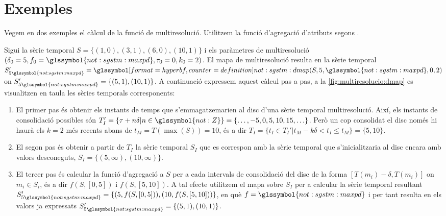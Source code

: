 \section{Exemples}

Vegem en dos exemples el càlcul de la funció de multiresolució.
Utilitzem la funció d'agregació d'atributs 
segons .


\begin{example}
  \label{ex:multiresolucio:dmap}
  Sigui la sèrie temporal $S=\{(1,0),(3,1),(6,0),(10,1)\}$ i els
  paràmetres de multiresolució
  $(\delta_0=5,f_0=\glssymbol{not:sgstm:maxpd},\tau_0=0,k_0=2)$.  El
  mapa de multiresolució resulta en la sèrie temporal
  $S_{5\glssymbol{not:sgstm:maxpd}}'=
  \glssymboldef{not:sgstm:dmap}(S,5,\glssymbol{not:sgstm:maxpd},0,2)$
  on $S'_{5\glssymbol{not:sgstm:maxpd}}=\{(5,1),(10,1)\}$. A
  continuació expressem aquest càlcul pas a pas, a la
  \autoref{fig:multiresolucio:dmap} es visualitzen en taula les sèries
  temporals corresponents:
  \begin{enumerate}
  \item El primer pas és obtenir els instants de temps que
    s'emmagatzemarien al disc d'una sèrie temporal
    multiresolució. Així, els instants de consolidació possibles són
    $T_I'=\{\tau+n\delta|n\in\glssymbol{not:Z}\}=
    \{\ldots,-5,0,5,10,15,\ldots\}$. Però un cop consolidat el disc
    només hi haurà els $k=2$ més recents abans de $t_M=T(\max(S))=10$,
    és a dir $T_I=\{t_I\in T_I'|t_M - k\delta < t_I \leq
    t_M\}=\{5,10\}$.

  \item El segon pas és obtenir a partir de $T_I$ la sèrie temporal
    $S_I$ que es correspon amb la sèrie temporal que s'inicialitzaria
    al disc encara amb valors desconeguts,
    $S_I=\{(5,\infty),(10,\infty)\}$.



  \item El tercer pas és calcular la funció d'agregació a $S$ per a
    cada intervals de consolidació del disc de la forma
    $[T(m_i)-\delta,T(m_i)]$ on $m_i\in S_i$, és a dir $f(S,[0,5])$ i
    $f(S,[5,10])$. A tal efecte utilitzem el mapa sobre $S_I$ per a
    calcular la sèrie temporal resultant
    $S'_{5\glssymbol{not:sgstm:maxpd}}=\{ (5,f(S,[0,5])),
    (10,f(S,[5,10])) \}$, en què $f=\glssymbol{not:sgstm:maxpd}$ i per
    tant resulta en els valors ja expressats
    $S'_{5\glssymbol{not:sgstm:maxpd}}=\{(5,1),(10,1)\}$.


\end{enumerate}
\end{example}
